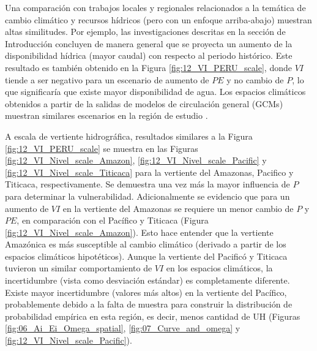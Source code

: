 \documentclass[12pt]{article}
\begin{document}
\thispagestyle{empty}

Una comparación con trabajos locales y regionales relacionados a la temática de cambio climático y recursos hídricos (pero con un enfoque arriba-abajo) muestran altas similitudes. Por ejemplo, las investigaciones descritas en la sección de Introducción \citep{Pouyaud2005,Juen2007,LavadoCasimiro2011,Andres2014,VanSoesbergen2016,Olsson2017,Pilares2018} concluyen de manera general que se proyecta un aumento de la disponibilidad hídrica (mayor caudal) con respecto al periodo histórico. Este resultado es también obtenido en la Figura \ref{fig:12_VI_PERU_scale}, donde $VI$ tiende a ser negativo para un escenario de aumento de $PE$ y no cambio de $P$, lo que significaría que existe mayor disponibilidad de agua. Los espacios climáticos obtenidos a partir de la salidas de modelos de circulación general (GCMs) muestran similares escenarios en la región de estudio \citep{stocker2013climate}. 



\thispagestyle{empty}

A escala de vertiente hidrográfica, resultados similares a la Figura \ref{fig:12_VI_PERU_scale} se muestra en las Figuras \ref{fig:12_VI_Nivel_scale_Amazon}, \ref{fig:12_VI_Nivel_scale_Pacific} y \ref{fig:12_VI_Nivel_scale_Titicaca} para la vertiente del Amazonas, Pacifico y Titicaca, respectivamente. Se demuestra una vez más la mayor influencia de $P$ para determinar la vulnerabilidad. Adicionalmente se evidencio que para un aumento de $VI$ en la vertiente del Amazonas se requiere un menor cambio de $P$ y $PE$, en comparación con el Pacífico y Titicaca (Figura \ref{fig:12_VI_Nivel_scale_Amazon}). Esto hace entender que la vertiente Amazónica es más susceptible al cambio climático (derivado a partir de los espacios climáticos hipotéticos). Aunque la vertiente del Pacificó y Titicaca tuvieron un similar comportamiento de $VI$ en los espacios climáticos, la incertidumbre (vista como desviación estándar) es completamente diferente. Existe mayor incertidumbre (valores más altos) en la vertiente del Pacífico, probablemente debido a la falta de muestra para construir la distribución de probabilidad empírica en esta región, es decir, menos cantidad de UH (Figuras \ref{fig:06_Ai_Ei_Omega_spatial}, \ref{fig:07_Curve_and_omega} y \ref{fig:12_VI_Nivel_scale_Pacific}). 


\vspace*{.5cm}

\end{document}
